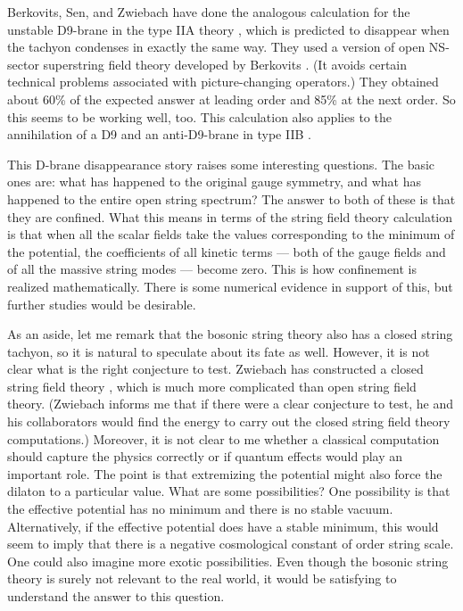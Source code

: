 \documentclass[a4paper,12pt]{article}
\begin{document}
Berkovits, Sen, and Zwiebach have done the analogous calculation
for the unstable D9-brane in the type IIA theory \cite{BSZ}, which
is predicted to disappear when the tachyon condenses in exactly
the same way.  They used a version of open NS-sector superstring
field theory developed by Berkovits \cite{NB}.  (It avoids certain
technical problems associated with picture-changing operators.)
They obtained about 60\% of the expected answer at leading order
and 85\% at the next order. So this seems to be working well, too.
This calculation also applies to the annihilation of a D9 and an
anti-D9-brane in type IIB \cite{AS3}.

This D-brane disappearance story raises some interesting
questions.  The basic ones are: what has happened to the original
\coordHE{} gauge symmetry, and what has happened to the entire open
string spectrum?  The answer to both of these is that they are
confined.  What this means in terms of the string field theory
calculation is that when all the scalar fields take the values
corresponding to the minimum of the potential, the coefficients of
all kinetic terms --- both of the gauge fields and of all the
massive string modes --- become zero.  This is how confinement is
realized mathematically.  There is some numerical evidence in
support of this, but further studies would be desirable.

As an aside, let me remark that the \coordHE{} bosonic string theory
also has a closed string tachyon, so it is natural to speculate
about its fate as well. However, it is not clear what is the right
conjecture to test.  Zwiebach has constructed a closed
string field theory \cite{BZ}, which is much more complicated
than open string field theory.  (Zwiebach informs me that if there were
a clear conjecture to test, he and his collaborators would find the energy to
carry out the closed string field theory computations.)
Moreover, it is not clear
to me
whether a classical computation should capture the physics
correctly or if quantum effects would play an important role. 
The point is that extremizing the potential might also force the
dilaton to a particular value. What
are some possibilities?  One possibility is that the effective
potential has no minimum and there is no stable vacuum.
Alternatively, if the effective potential does have a stable
minimum, this would seem to imply that there is a negative
cosmological constant of order string scale. One could also
imagine more exotic possibilities. Even though the bosonic string
theory is surely not relevant to the real world, it would be
satisfying to understand the answer to this question.
\end{document}
